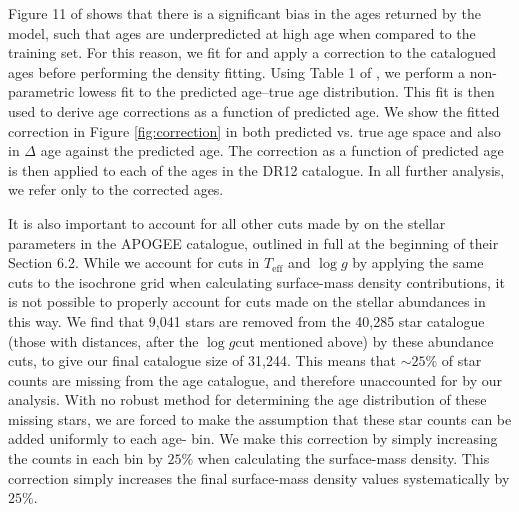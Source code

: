 Figure 11 of \citet{2016MNRAS.456.3655M} shows that there is a significant bias in the ages returned by the model, such that ages are underpredicted at high age when compared to the training set. For this reason, we fit for and apply a correction to the catalogued ages before performing the density fitting. Using Table 1 of \citet{2016MNRAS.456.3655M}, we perform a non-parametric lowess fit to the predicted age--true age distribution. This fit is then used to derive age corrections as a function of predicted age. We show the fitted correction in Figure \ref{fig:correction} in both predicted vs. true age space and also in $\Delta$ age against the predicted age. The correction as a function of predicted age is then applied to each of the ages in the DR12 catalogue. In all further analysis, we refer only to the corrected ages.   

It is also important to account for all other cuts made by \citet{2016MNRAS.456.3655M} on the stellar parameters in the APOGEE catalogue, outlined in full at the beginning of their Section 6.2. While we account for cuts in $T_{\mathrm{eff}}$ and $\log{g}$ by applying the same cuts to the isochrone grid when calculating surface-mass density contributions, it is not possible to properly account for cuts made on the stellar abundances in this way. We find that 9,041 stars are removed from the 40,285 star catalogue (those with distances, after the $\log{g} $cut mentioned above) by these abundance cuts, to give our final catalogue size of 31,244. This means that $\sim 25\%$ of star counts are missing from the age catalogue, and therefore unaccounted for by our analysis. With no robust method for determining the age distribution of these missing stars, we are forced to make the assumption that these star counts can be added uniformly to each age-\feh{} bin. We make this correction by simply increasing the counts in each bin by $25\%$ when calculating the surface-mass density. This correction simply increases the final surface-mass density values systematically by $25\%$.

